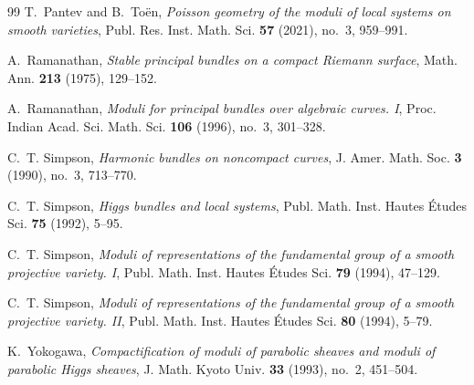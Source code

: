 \documentclass[11pt,reqno]{amsart}
\numberwithin{equation}{section}
\theoremstyle{plain}
\theoremstyle{definition}
\theoremstyle{remark}
\begin{document}
\begin{thebibliography}{99}
T.~Pantev and B.~To\"en,
\emph{Poisson geometry of the moduli of local systems on smooth varieties},
Publ. Res. Inst. Math. Sci. \textbf{57} (2021), no.~3, 959--991.

A.~Ramanathan,
\emph{Stable principal bundles on a compact Riemann surface},
Math. Ann. \textbf{213} (1975), 129--152.

A.~Ramanathan,
\emph{Moduli for principal bundles over algebraic curves. I},
Proc. Indian Acad. Sci. Math. Sci. \textbf{106} (1996), no.~3, 301--328.

C.~T. Simpson,
\emph{Harmonic bundles on noncompact curves},
J. Amer. Math. Soc. \textbf{3} (1990), no.~3, 713--770.

C.~T. Simpson,
\emph{Higgs bundles and local systems},
Publ. Math. Inst. Hautes \'Etudes Sci. \textbf{75} (1992), 5--95.

C.~T. Simpson,
\emph{Moduli of representations of the fundamental group of a smooth
projective variety. I},
Publ. Math. Inst. Hautes \'Etudes Sci. \textbf{79} (1994), 47--129.

C.~T. Simpson,
\emph{Moduli of representations of the fundamental group of a smooth
projective variety. II},
Publ. Math. Inst. Hautes \'Etudes Sci. \textbf{80} (1994), 5--79.

K.~Yokogawa,
\emph{Compactification of moduli of parabolic sheaves and moduli of parabolic
Higgs sheaves},
J. Math. Kyoto Univ. \textbf{33} (1993), no.~2, 451--504.

\end{thebibliography}
\end{document}

